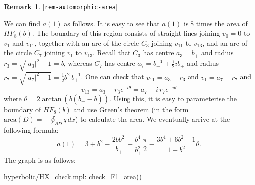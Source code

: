 \documentclass[reqno]{amsart}
\newcommand{\lbl}[1]{\label{#1}\textup{[\texttt{#1}]}\par}
\newcommand{\lbl}{\label}
\newcommand{\tht}       {\theta}
\newcommand{\half}      {\tfrac{1}{2}}
\renewcommand{\:}{\colon}
\theoremstyle{definition}
\newtheorem{remark}[theorem]{Remark}
\begin{document}
\begin{remark}\lbl{rem-automorphic-area}
 We can find $a(1)$ as follows.  It is easy to see that $a(1)$ is $8$
 times the area of $HF_8(b)$.  The boundary of this region consists
 of straight lines joining $v_0=0$ to $v_1$ and $v_{11}$, together
 with an arc of the circle $C_3$ joining $v_{11}$ to $v_{13}$, and an
 arc of the circle $C_7$ joining $v_1$ to $v_{13}$.  Recall that $C_3$
 has centre $a_3=b_+$ and radius $r_3=\sqrt{|a_3|^2-1}=b$, whereas
 $C_7$ has centre $a_7=b_+^{-1}+\half ib_+$ and radius
 $r_7=\sqrt{|a_7|^2-1}=\half b_-^2b_+^{-1}$.  One can check that
 $v_{11}=a_3-r_3$ and $v_1=a_7-r_7$ and
 \[ v_{13} = a_3 - r_3 e^{-i\tht} = a_7 - i\,r_7 e^{-i\tht} \]
 where $\tht=2\arctan(b(b_+-b))$.  Using this, it is easy to
 parameterise the boundary of $HF_8(b)$ and use Green's theorem (in the
 form $\text{area}(D)=-\oint_{\partial D}y\,dx$) to calculate the
 area.  We eventually arrive at the following formula:
 \[ a(1) =
  3+b^2
  - \frac{2bb_-^2}{b_+} - \frac{b_-^4}{b_+^2}\frac{\pi}{2}
  - \frac{3b^4+6b^2-1}{1+b^2}\tht.
 \]
 The graph is as follows:
 \begin{center}
 \end{center}
 \begin{checks}
  hyperbolic/HX_check.mpl: check_F1_area()
 \end{checks}
\end{remark}
\end{document}
